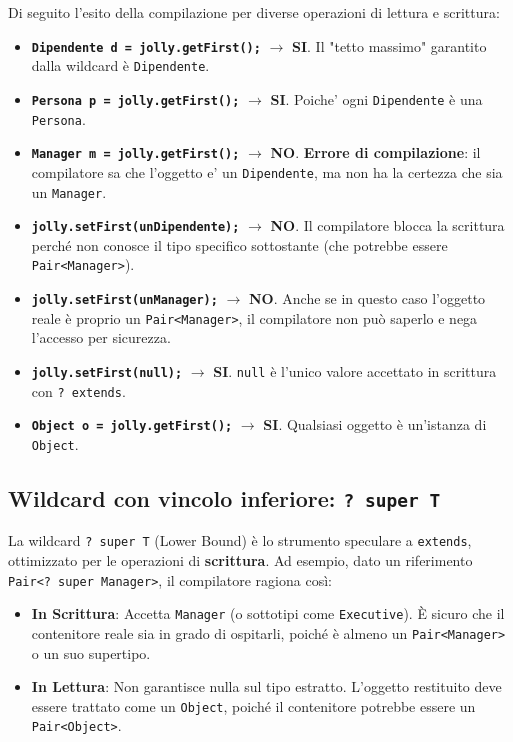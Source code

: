Di seguito l'esito della compilazione per diverse operazioni di lettura e scrittura:

\begin{itemize}
    \item \textbf{\texttt{Dipendente d = jolly.getFirst();}} $\rightarrow$ \textbf{SI}. Il "tetto massimo" garantito dalla wildcard è \texttt{Dipendente}.
    \item \textbf{\texttt{Persona p = jolly.getFirst();}} $\rightarrow$ \textbf{SI}. Poiche' ogni \texttt{Dipendente} è una \texttt{Persona}.
    \item \textbf{\texttt{Manager m = jolly.getFirst();}} $\rightarrow$ \textbf{NO}. \textbf{Errore di compilazione}: il compilatore sa che l'oggetto e' un \texttt{Dipendente}, ma non ha la certezza che sia un \texttt{Manager}.
    \item \textbf{\texttt{jolly.setFirst(unDipendente);}} $\rightarrow$ \textbf{NO}. Il compilatore blocca la scrittura perché non conosce il tipo specifico sottostante (che potrebbe essere \texttt{Pair<Manager>}).
    \item \textbf{\texttt{jolly.setFirst(unManager);}} $\rightarrow$ \textbf{NO}. Anche se in questo caso l'oggetto reale è proprio un \texttt{Pair<Manager>}, il compilatore non può saperlo e nega l'accesso per sicurezza.
    \item \textbf{\texttt{jolly.setFirst(null);}} $\rightarrow$ \textbf{SI}. \texttt{null} è l'unico valore accettato in scrittura con \texttt{? extends}.
    \item \textbf{\texttt{Object o = jolly.getFirst();}} $\rightarrow$ \textbf{SI}. Qualsiasi oggetto è un'istanza di \texttt{Object}.
\end{itemize}

\subsection{Wildcard con vincolo inferiore: \texttt{? super T}}

La wildcard \texttt{? super T} (Lower Bound) è lo strumento speculare a \texttt{extends}, ottimizzato per le operazioni di \textbf{scrittura}. Ad esempio, dato un riferimento \texttt{Pair<? super Manager>}, il compilatore ragiona così:
\begin{itemize}
    \item \textbf{In Scrittura}: Accetta \texttt{Manager} (o sottotipi come \texttt{Executive}). È sicuro che il contenitore reale sia in grado di ospitarli, poiché è almeno un \texttt{Pair<Manager>} o un suo supertipo.
    \item \textbf{In Lettura}: Non garantisce nulla sul tipo estratto. L'oggetto restituito deve essere trattato come un \texttt{Object}, poiché il contenitore potrebbe essere un \texttt{Pair<Object>}.
\end{itemize}

